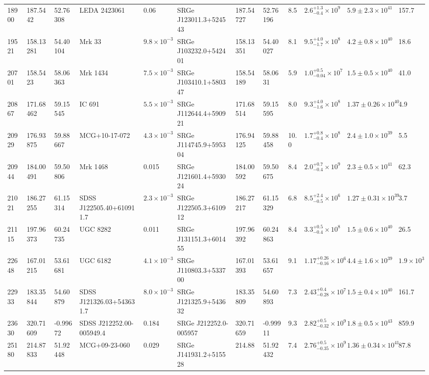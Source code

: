 \begin{longtable}{llllllllllll}
18900 & 187.5442 & 52.76308 & LEDA 2423061 & 0.06 & SRGe J123011.3+524543 & 187.54727 & 52.76196 & 8.5 & $2.6^{+1.3}_{-0.4}\times10^{9}$ & $5.9\pm2.3\times10^{41}$ & 157.7 \\
19521 & 158.13281 & 54.40104 & Mrk   33 & $9.8\times10^{-3}$ & SRGe J103232.0+542401 & 158.13351 & 54.40027 & 8.1 & $9.5^{+4.0}_{-1.7}\times10^{8}$ & $4.2\pm0.8\times10^{40}$ & 18.6 \\
20701 & 158.5423 & 58.06363 & Mrk 1434 & $7.5\times10^{-3}$ & SRGe J103410.1+580347 & 158.54189 & 58.0631 & 5.9 & $1.0^{+0.5}_{-0.04}\times10^{7}$ & $1.5\pm0.5\times10^{40}$ & 41.0 \\
20867 & 171.68462 & 59.15545 & IC  691 & $5.5\times10^{-3}$ & SRGe J112644.4+590921 & 171.68514 & 59.15595 & 8.0 & $9.3^{+4.0}_{-1.6}\times10^{8}$ & $1.37\pm0.26\times10^{40}$ & 4.9 \\
20929 & 176.93875 & 59.88667 & MCG+10-17-072 & $4.3\times10^{-3}$ & SRGe J114745.9+595304 & 176.94125 & 59.88458 & 10.0 & $1.7^{+0.8}_{-0.4}\times10^{8}$ & $2.4\pm1.0\times10^{39}$ & 5.5 \\
20944 & 184.00491 & 59.50806 & Mrk 1468 & 0.015 & SRGe J121601.4+593024 & 184.00592 & 59.50675 & 8.4 & $2.0^{+0.7}_{-0.4}\times10^{9}$ & $2.3\pm0.5\times10^{41}$ & 62.3 \\
21021 & 186.27255 & 61.15314 & SDSS J122505.40+610911.7 & $2.3\times10^{-3}$ & SRGe J122505.3+610912 & 186.27217 & 61.15329 & 6.8 & $8.5^{+2.4}_{-0.5}\times10^{6}$ & $1.27\pm0.31\times10^{39}$ & 3.7 \\
21115 & 197.96373 & 60.24735 & UGC  8282 & 0.011 & SRGe J131151.3+601455 & 197.96392 & 60.24863 & 8.4 & $3.3^{+0.5}_{-0.4}\times10^{8}$ & $1.5\pm0.6\times10^{40}$ & 26.5 \\
22648 & 167.01215 & 53.61681 & UGC  6182 & $4.1\times10^{-3}$ & SRGe J110803.3+533700 & 167.01393 & 53.61657 & 9.1 & $1.17^{+0.26}_{-0.16}\times10^{6}$ & $4.4\pm1.6\times10^{39}$ & $1.9\times10^{3}$ \\
22933 & 183.35844 & 54.60879 & SDSS J121326.03+543631.7 & $8.0\times10^{-3}$ & SRGe J121325.9+543632 & 183.35809 & 54.60893 & 7.3 & $2.43^{+0.4}_{-0.28}\times10^{7}$ & $1.5\pm0.4\times10^{40}$ & 161.7 \\
23630 & 320.71609 & -0.99672 & SDSS J212252.00-005949.4 & 0.184 & SRGe J212252.0-005957 & 320.71659 & -0.99911 & 9.3 & $2.82^{+0.5}_{-0.32}\times10^{9}$ & $1.8\pm0.5\times10^{43}$ & 859.9 \\
25180 & 214.87833 & 51.92448 & MCG+09-23-060 & 0.029 & SRGe J141931.2+515528 & 214.88 & 51.92432 & 7.4 & $2.76^{+0.5}_{-0.35}\times10^{9}$ & $1.36\pm0.34\times10^{41}$ & 87.8 \\

\end{longtable}
